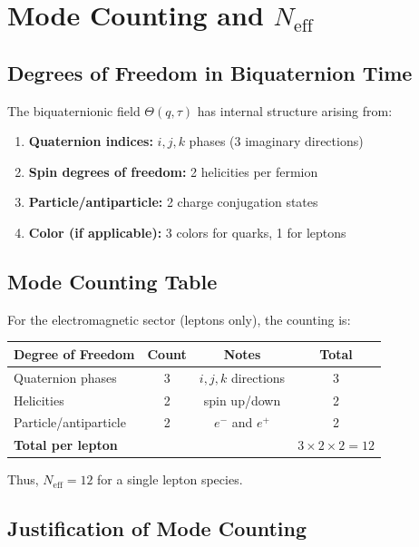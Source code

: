 \documentclass[11pt,a4paper]{article}
\theoremstyle{remark}
\begin{document}
\section{Mode Counting and $N_{\text{eff}}$}
\label{sec:mode-counting}

\subsection{Degrees of Freedom in Biquaternion Time}

The biquaternionic field $\Theta(q, \tau)$ has internal structure arising from:
\begin{enumerate}
\item \textbf{Quaternion indices:} $i, j, k$ phases (3 imaginary directions)
\item \textbf{Spin degrees of freedom:} 2 helicities per fermion
\item \textbf{Particle/antiparticle:} 2 charge conjugation states
\item \textbf{Color (if applicable):} 3 colors for quarks, 1 for leptons
\end{enumerate}

\subsection{Mode Counting Table}

For the electromagnetic sector (leptons only), the counting is:

\begin{center}
\begin{tabular}{|l|c|c|c|}
\hline
\textbf{Degree of Freedom} & \textbf{Count} & \textbf{Notes} & \textbf{Total} \\
\hline
Quaternion phases & 3 & $i, j, k$ directions & 3 \\
Helicities & 2 & spin up/down & 2 \\
Particle/antiparticle & 2 & $e^-$ and $e^+$ & 2 \\
\hline
\textbf{Total per lepton} & & & $3 \times 2 \times 2 = 12$ \\
\hline
\end{tabular}
\end{center}

Thus, $N_{\text{eff}} = 12$ for a single lepton species.

\subsection{Justification of Mode Counting}
\end{document}
